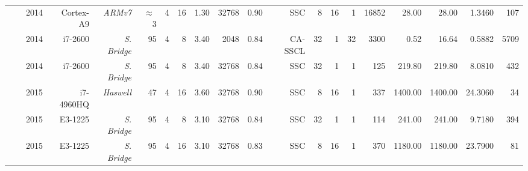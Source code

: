 \begin{table}[htp]
{{\begin{tabular}{|r|r r|r r r r r r|r r|r r r r|r r|r r r|}
                                                                 & \cite{LeGal2014}     & 2014          & Cortex-A9          & \textit{ARMv7}     & $\approx~$3  & {\color{Paired-1}4} &  16           & 1.30           & 32768    & 0.90     &      SSC           &  8            &                    16  &  1                &                   16852  &                    28.00  &   28.00               &  1.3460        &    107             \\
                                                                 & \cite{Sarkis2014b}   & 2014          & i7-2600            & \textit{S. Bridge} &          95  & {\color{Paired-1}4} &   8           & 3.40           &  2048    & 0.84     &   CA-SSCL          & 32            &                     1  & 32                &                    3300  &                     0.52  &   16.64               &  0.5882        &   5709             \\
                                                                 & \cite{Sarkis2014}    & 2014          & i7-2600            & \textit{S. Bridge} &          95  & {\color{Paired-1}4} &   8           & 3.40           & 32768    & 0.84     &      SSC           & 32            &                     1  &  1                &                     125  &                   219.80  &  219.80               &  8.0810        &    432             \\
                                                                 & \cite{LeGal2015a}    & 2015          & i7-4960HQ          & \textit{Haswell}   &          47  & {\color{Paired-1}4} &  16           & 3.60           & 32768    & 0.90     &      SSC           &  8            &                    16  &  1                &                     337  &                  1400.00  & 1400.00               & 24.3060        &     34             \\
                                                                 & \cite{Cassagne2015c} & 2015          & E3-1225            & \textit{S. Bridge} &          95  & {\color{Paired-1}4} &   8           & 3.10           & 32768    & 0.84     &      SSC           & 32            &                     1  &  1                &                     114  &                   241.00  &  241.00               &  9.7180        &    394             \\
                                                                 & \cite{Cassagne2015c} & 2015          & E3-1225            & \textit{S. Bridge} &          95  & {\color{Paired-1}4} &  16           & 3.10           & 32768    & 0.83     &      SSC           &  8            &                    16  &  1                &                     370  &                  1180.00  & 1180.00               & 23.7900        &     81             \\

\end{tabular}}}
\end{table}
